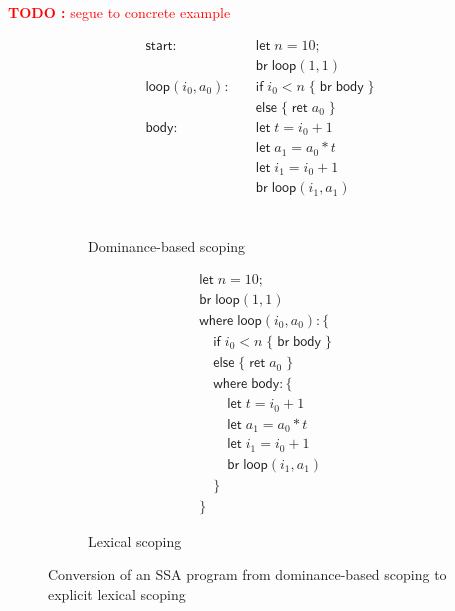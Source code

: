 \documentclass[acmsmall,screen,review]{acmart}
\newcounter{todos}
\newcommand{\TODO}[1]{{
  \stepcounter{todos}
  \begin{center}\large{\textcolor{red}{\textbf{TODO \arabic{todos}:} #1}}\end{center}
}}
\newcommand{\ms}[1]{\ensuremath{\mathsf{#1}}}
\begin{document}
\TODO{segue to concrete example}

\begin{figure}
  \centering
  \begin{subfigure}[t]{.5\textwidth}
    \begin{align*}
      \ms{start}:\quad            & \ms{let}\;n = 10; \\
                                  & \ms{br}\;\ms{loop}(1, 1) \\
      \ms{loop}(i_0, a_0): \quad  & \ms{if}\;i_0 < n\; \{\;\ms{br}\;\ms{body}\;\} \\
                                  & \ms{else}\;\{\;\ms{ret}\;a_0\;\} \\
      \ms{body}: \quad            & \ms{let}\;t = i_0 + 1 \\
                                  & \ms{let}\;a_1 = a_0 * t \\
                                  & \ms{let}\;i_1 = i_0 + 1 \\
                                  & \ms{br}\;\ms{loop}(i_1, a_1) \\ \\ \\ \\ 
    \end{align*}
    \caption{Dominance-based scoping}
  \end{subfigure}%
  \begin{subfigure}[t]{.5\textwidth}
    \begin{align*}
      & \ms{let}\;n = 10; \\
      & \ms{br}\;\ms{loop}(1, 1) \\
      & \ms{where}\;\ms{loop}(i_0, a_0): \{ \\
      & \quad \ms{if}\;i_0 < n\;\{\;\ms{br}\;\ms{body}\;\} \\
      & \quad \ms{else}\;\{\;\ms{ret}\;a_0\;\} \\
      & \quad \ms{where}\;\ms{body}: \{\\ 
      & \qquad \ms{let}\;t = i_0 + 1 \\
      & \qquad \ms{let}\;a_1 = a_0 * t \\
      & \qquad \ms{let}\;i_1 = i_0 + 1 \\
      & \qquad \ms{br}\;\ms{loop}(i_1, a_1) \\
      & \quad \} \\
      & \}
    \end{align*}
    \caption{Lexical scoping}
  \end{subfigure}
  \caption{Conversion of an SSA program from dominance-based scoping to explicit lexical scoping}
  \Description{}
  \label{fig:dominance-to-lexical}
\end{figure}
\end{document}
